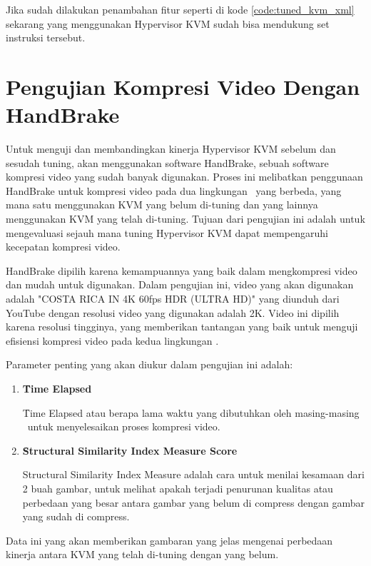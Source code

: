 Jika sudah dilakukan penambahan fitur seperti di kode \ref{code:tuned_kvm_xml} sekarang \vm yang menggunakan Hypervisor KVM sudah bisa mendukung set instruksi tersebut.

\section{Pengujian Kompresi Video Dengan HandBrake}
Untuk menguji dan membandingkan kinerja Hypervisor KVM sebelum dan sesudah tuning, {\saya} akan menggunakan software HandBrake, sebuah software kompresi video yang sudah banyak digunakan. Proses ini melibatkan penggunaan HandBrake untuk kompresi video pada dua lingkungan \vm\ yang berbeda, yang mana satu menggunakan KVM yang belum di-tuning dan yang lainnya menggunakan KVM yang telah di-tuning. Tujuan dari pengujian ini adalah untuk mengevaluasi sejauh mana tuning Hypervisor KVM dapat mempengaruhi kecepatan kompresi video.

HandBrake dipilih karena kemampuannya yang baik dalam mengkompresi video dan mudah untuk digunakan\cite{Folgar2014eg}. Dalam pengujian ini, video yang akan digunakan adalah "COSTA RICA IN 4K 60fps HDR (ULTRA HD)" yang diunduh dari YouTube dengan resolusi video yang digunakan adalah 2K. Video ini dipilih karena resolusi tingginya, yang memberikan tantangan yang baik untuk menguji efisiensi kompresi video pada kedua lingkungan \vm. 

Parameter penting yang akan diukur dalam pengujian ini adalah: 

\begin{enumerate}
    \item \textbf{\f{Time Elapsed}}
    
    \f{Time Elapsed} atau berapa lama waktu yang dibutuhkan oleh masing-masing \vm\ untuk menyelesaikan proses kompresi video.
        
    \item \textbf{\f{Structural Similarity Index Measure Score}}
    
    Structural Similarity Index Measure adalah cara untuk menilai kesamaan dari 2 buah gambar, untuk melihat apakah terjadi penurunan kualitas atau perbedaan yang besar antara gambar yang belum di compress dengan gambar yang sudah di compress.
\end{enumerate}


Data ini yang akan memberikan gambaran yang jelas mengenai perbedaan kinerja antara KVM yang telah di-tuning dengan yang belum.

